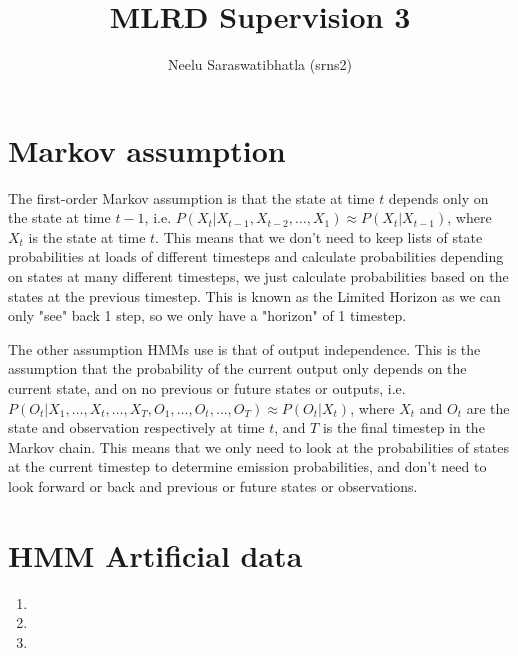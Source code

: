 \documentclass[12pt]{article}
\author{Neelu Saraswatibhatla (srns2)}
\title{MLRD Supervision 3}
\date{\vspace{-5ex}}
\begin{document}
\maketitle

\section*{Markov assumption}

The first-order Markov assumption is that the state at time $t$ depends only on the state at time $t-1$, i.e. $P(X_t | X_{t-1}, X_{t-2}, \ldots, X_1) \approx P(X_t | X_{t-1})$, where $X_t$ is the state at time $t$.
This means that we don't need to keep lists of state probabilities at loads of different timesteps and calculate probabilities depending on states at many different timesteps, we just calculate probabilities based on the states at the previous timestep.
This is known as the Limited Horizon as we can only "see" back 1 step, so we only have a "horizon" of 1 timestep.

The other assumption HMMs use is that of output independence. This is the assumption that the probability of the current output only depends on the current state, and on no previous or future states or outputs, i.e. $P(O_t | X_1, \ldots, X_t, \ldots, X_T, O_1, \ldots, O_t, \ldots, O_T) \approx P(O_t | X_t)$, where $X_t$ and $O_t$ are the state and observation respectively at time $t$, and $T$ is the final timestep in the Markov chain.
This means that we only need to look at the probabilities of states at the current timestep to determine emission probabilities, and don't need to look forward or back and previous or future states or observations.

\section*{HMM Artificial data}
\begin{enumerate}
    \item 
    \item 
    \item 
\end{enumerate}
\end{document}
